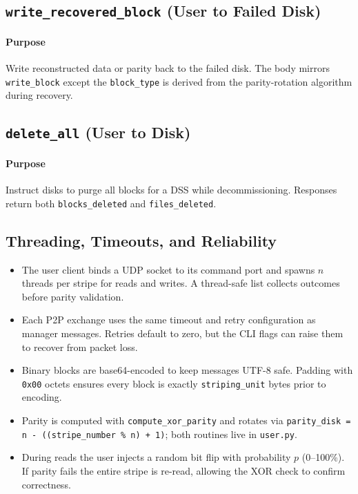 \documentclass[11pt]{article}
\begin{document}
\subsection{\texttt{write\_recovered\_block} (User to Failed Disk)}
\paragraph{Purpose} Write reconstructed data or parity back to the failed disk. The body mirrors \texttt{write\_block} except the \texttt{block\_type} is derived from the parity-rotation algorithm during recovery.

\subsection{\texttt{delete\_all} (User to Disk)}
\paragraph{Purpose} Instruct disks to purge all blocks for a DSS while decommissioning. Responses return both \texttt{blocks\_deleted} and \texttt{files\_deleted}.

\subsection{Threading, Timeouts, and Reliability}
\begin{itemize}
  \item The user client binds a UDP socket to its command port and spawns $n$ threads per stripe for reads and writes. A thread-safe list collects outcomes before parity validation.
  \item Each P2P exchange uses the same timeout and retry configuration as manager messages. Retries default to zero, but the CLI flags can raise them to recover from packet loss.
  \item Binary blocks are base64-encoded to keep messages UTF-8 safe. Padding with \texttt{0x00} octets ensures every block is exactly \texttt{striping\_unit} bytes prior to encoding.
  \item Parity is computed with \texttt{compute\_xor\_parity} and rotates via \texttt{parity\_disk = n - ((stripe\_number \% n) + 1)}; both routines live in \texttt{user.py}.
  \item During reads the user injects a random bit flip with probability $p$ (0--100\%). If parity fails the entire stripe is re-read, allowing the XOR check to confirm correctness.
\end{itemize}
\end{document}
